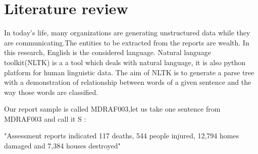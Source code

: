 \chapter{Literature review}

In today's life, many organizations are generating unstructured data while they are communicating.The entities to be extracted from the reports are wealth.
In this research, English is the considered language.
Natural language toolkit(NLTK) is a a tool which deals with natural language, it is also  python platform for human linguistic data. 
The aim of NLTK is to generate a parse tree with a demonstration of relationship between words of a given sentence and the way those words are  classified.

Our report  sample is called MDRAF003,let us take one sentence from MDRAF003 and call it S
:
 
"Assessment reports indicated 117 deaths, 544 people injured, 12,794 homes damaged and 7,384 houses destroyed"

